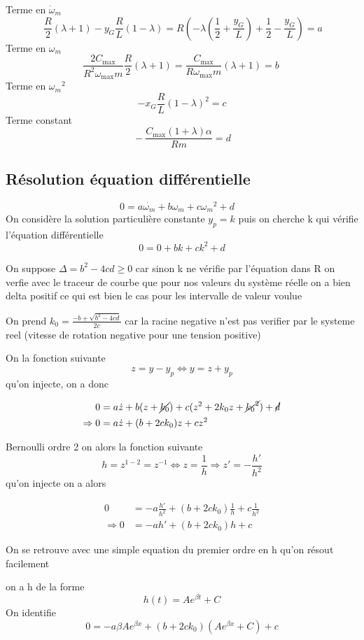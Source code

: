 \documentclass[a4paper,12pt]{report}  %
\begin{document}
Terme en $\dot{\omega}_m$
$$
\ \frac{R}{2} (\lambda + 1)- y_G \frac{R}{L} (1 - \lambda)= R(-\lambda(\frac{1}{2}+\frac{y_G}{L})+ \frac{1}{2}-\frac{y_G}{L}) = a
$$
Terme en ${\omega}_m$
$$
\frac{ 2C_{\text{max}}}{R^2 \omega_{\text{max}} m} \frac{R}{2}(\lambda + 1) = \frac{ C_{\text{max}}}{R \omega_{\text{max}} m} (\lambda + 1) = b \
$$
Terme en ${\omega_m}^2$
$$
-x_G \frac{R}{L}{(1 - \lambda)}^2 = c
$$
Terme constant 
$$
\ - \frac{C_{\text{max}} (1 + \lambda) \alpha}{R m} = d \
$$
\subsection{Résolution équation différentielle}

$$0 = a \dot{\omega_m} + b\omega_m + c {\omega_m}^2 + d \quad $$
On considère la solution particulière constante $y_p = k$ puis on cherche k qui vérifie l’équation différentielle
$$0 = 0 + bk + c k^2 + d$$


On suppose $\Delta = b^2 - 4cd \geq 0$ car sinon k ne vérifie par l'équation dans R 
on verfie avec le traceur de courbe que pour nos valeurs du système réelle on a bien delta positif ce qui est bien le cas pour les intervalle de valeur voulue 

On prend $k_0 = \frac{-b + \sqrt{b^2 - 4cd}}{2c}$ car la racine negative n'est pas verifier par le systeme reel (vitesse de rotation negative pour une tension positive)


On la fonction suivante  $$z = y-y_p \Leftrightarrow y = z + y_p$$
qu'on injecte, on a donc 

\begin{align}
	0 &= a \dot{z} + b (z + \cancel{k_0}) + c (z^2+2k_0z + \cancel{{k_0}^2}) + \cancel{d}
	\\
	\Rightarrow 0 &= a \dot{z} + (b + 2c k_0){z} + c z^2
\end{align}

Bernoulli ordre 2 on alors la fonction suivante  
$$h = z^{1-2} = z^{-1} \Leftrightarrow z = \frac{1}{h} \Rightarrow z'= - \frac{h'}{h^2}$$
qu'on injecte on a alors 

\begin{align}
	0 &= -a \frac{h'}{h^2} + (b + 2 c k_0)  \frac{1}{h} + c\frac{1}{h^2}
	\\
	\Rightarrow0 &= -a h' + (b + 2 c k_0) h + c
\end{align}

On se retrouve avec une simple equation du premier ordre en h qu'on résout facilement

on a h de la forme
$$h(t) = A e^{\beta t} + C$$
On identifie
$$0 = -a \beta A e^{\beta x} + (b + 2c k_0)( A e^{\beta x} + C)+ c$$
\end{document}
